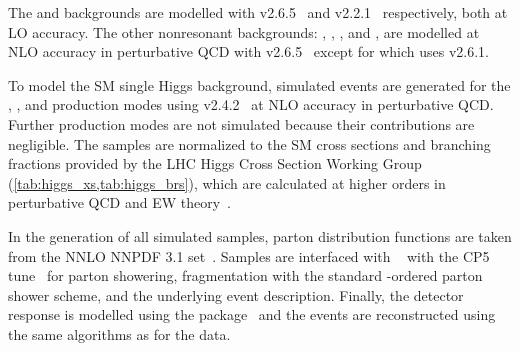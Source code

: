 The \gjet and \ggjet backgrounds are modelled with \MGvATNLO v2.6.5~\cite{MadGraph,MadGraphMLM} and \SHERPA v2.2.1~\cite{10.21468/SciPostPhys.7.3.034} respectively, both at LO accuracy. The other nonresonant backgrounds: \vgamma, \ttbar, \ttgamma, and \ttgammagamma, are modelled at NLO accuracy in perturbative QCD with \MGvATNLO v2.6.5~\cite{MadGraph,MadGraphMLM,MadGraphFXFX} except for \ttbar which uses \MGvATNLO v2.6.1.

To model the SM single Higgs background, simulated events are generated for the \ggH, \VBF, \VH and \ttH production modes using \MGvATNLO v2.4.2~\cite{MadGraph,MadGraphMLM,MadGraphFXFX} at NLO accuracy in perturbative QCD. Further production modes are not simulated because their contributions are negligible. The samples are normalized to the SM cross sections and branching fractions provided by the LHC Higgs Cross Section Working Group (\cref{tab:higgs_xs,tab:higgs_brs}), which are calculated at higher orders in perturbative QCD and EW theory~\cite{LHCHiggsCrossSectionWorkingGroup:2016ypw}.

In the generation of all simulated samples, parton distribution functions are taken from the NNLO NNPDF 3.1 set~\cite{NNPDF31}. Samples are interfaced with ~\cite{Sjostrand:2014zea} with the CP5 tune~\cite{CMS:2015wcf,CMS:2019csb} for parton showering, fragmentation with the standard \pt-ordered parton shower scheme, and the underlying event description. Finally, the detector response is modelled using the \GEANTfour package~\cite{Agostinelli:2002hh} and the events are reconstructed using the same algorithms as for the data.

